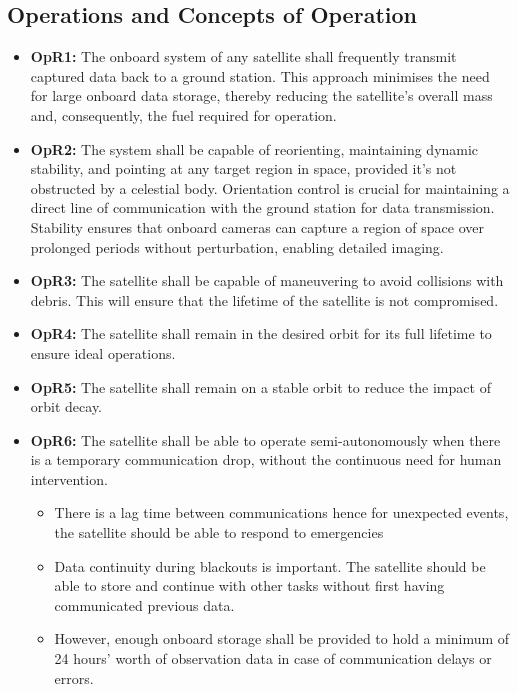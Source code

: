 \subsection{Operations and Concepts of Operation}
\begin{itemize}
    \item \textbf{OpR1:} The onboard system of any satellite shall frequently transmit captured data back to a ground station. This approach minimises the need for large onboard data storage, thereby reducing the satellite's overall mass and, consequently, the fuel required for operation.
    \item \textbf{OpR2:} The system shall be capable of reorienting, maintaining dynamic stability, and pointing at any target region in space, provided it's not obstructed by a celestial body. Orientation control is crucial for maintaining a direct line of communication with the ground station for data transmission. Stability ensures that onboard cameras can capture a region of space over prolonged periods without perturbation, enabling detailed imaging.
    \item \textbf{OpR3:} The satellite shall be capable of maneuvering to avoid collisions with debris. This will ensure that the lifetime of the satellite is not compromised.
    \item \textbf{OpR4:} The satellite shall remain in the desired orbit for its full lifetime to ensure ideal operations.
    \item \textbf{OpR5:} The satellite shall remain on a stable orbit to reduce the impact of orbit decay.
    \item \textbf{OpR6:} The satellite shall be able to operate semi-autonomously when there is a temporary communication drop, without the continuous need for human intervention.
    \begin{itemize}
        \item There is a lag time between communications hence for unexpected events, the satellite should be able to respond to emergencies
        \item Data continuity during blackouts is important. The satellite should be able to store and continue with other tasks without first having communicated previous data.
        \item However, enough onboard storage shall be provided to hold a minimum of 24 hours’ worth of observation data in case of communication delays or errors.
    \end{itemize}
\end{itemize}